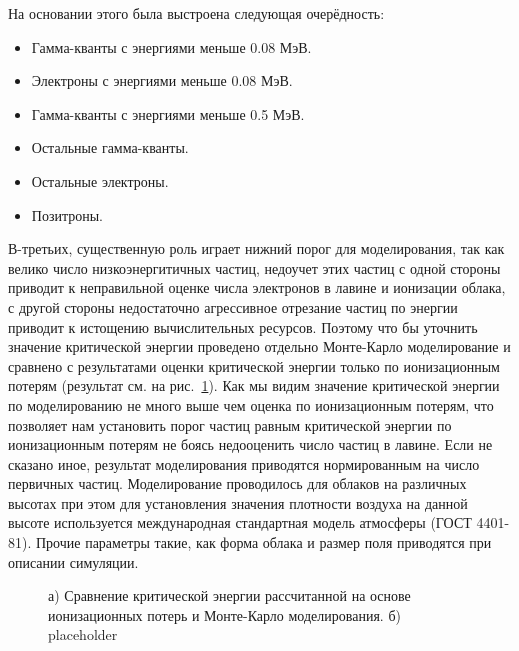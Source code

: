 На основании этого была выстроена следующая очерёдность:
\begin{itemize}
    \item Гамма-кванты с энергиями меньше 0.08 МэВ.
    \item Электроны с энергиями меньше 0.08 МэВ.
    \item Гамма-кванты с энергиями меньше 0.5 МэВ.
    \item Остальные гамма-кванты.
    \item Остальные электроны.
    \item Позитроны.
\end{itemize}
В-третьих, существенную роль играет нижний порог для моделирования, так как велико число низкоэнергитичных частиц, недоучет этих частиц с одной стороны приводит к неправильной оценке числа электронов в лавине и ионизации облака, с другой стороны недостаточно агрессивное отрезание частиц по энергии приводит к истощению вычислительных ресурсов. Поэтому что бы уточнить значение критической энергии проведено отдельно Монте-Карло моделирование и сравнено с результатами оценки критической энергии только по ионизационным потерям (результат см. на рис.~\ref{fig:storm:simcrit}). Как мы видим значение критической энергии по моделированию не много выше чем оценка по ионизационным потерям, что позволяет нам установить порог частиц равным критической энергии по ионизационным потерям не боясь недооценить число частиц в лавине.
Если не сказано иное, результат моделирования приводятся нормированным на число первичных частиц. Моделирование проводилось для облаков на различных высотах при этом для установления значения плотности воздуха на данной высоте используется международная стандартная модель атмосферы (ГОСТ 4401-81). Прочие параметры такие, как форма облака и размер поля приводятся при описании симуляции.


\begin{figure}[t]
    \begin{center}
        \begin{minipage}[h]{0.49\linewidth}
        \end{minipage}
        \hfill
        \begin{minipage}[h]{0.49\linewidth}
        \end{minipage}
        \caption{а) Сравнение критической энергии рассчитанной на основе ионизационных потерь и Монте-Карло моделирования. б) placeholder}
    \end{center}
    \label{fig:storm:simcrit}
\end{figure}

